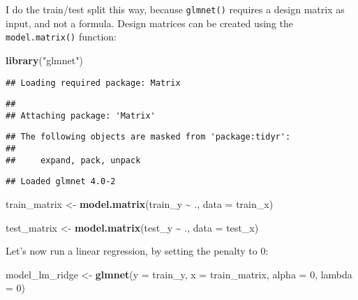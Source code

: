 \documentclass[
]{article}
\newenvironment{Shaded}{\begin{snugshade}}{\end{snugshade}}
\newcommand{\DataTypeTok}[1]{\textcolor[rgb]{0.13,0.29,0.53}{#1}}
\newcommand{\DecValTok}[1]{\textcolor[rgb]{0.00,0.00,0.81}{#1}}
\newcommand{\KeywordTok}[1]{\textcolor[rgb]{0.13,0.29,0.53}{\textbf{#1}}}
\newcommand{\NormalTok}[1]{#1}
\newcommand{\OperatorTok}[1]{\textcolor[rgb]{0.81,0.36,0.00}{\textbf{#1}}}
\newcommand{\StringTok}[1]{\textcolor[rgb]{0.31,0.60,0.02}{#1}}
\begin{document}
I do the train/test split this way, because \texttt{glmnet()} requires a design matrix as input, and not
a formula. Design matrices can be created using the \texttt{model.matrix()} function:

\begin{Shaded}
\begin{Highlighting}[]
\KeywordTok{library}\NormalTok{(}\StringTok{"glmnet"}\NormalTok{)}
\end{Highlighting}
\end{Shaded}

\begin{verbatim}
## Loading required package: Matrix
\end{verbatim}

\begin{verbatim}
## 
## Attaching package: 'Matrix'
\end{verbatim}

\begin{verbatim}
## The following objects are masked from 'package:tidyr':
## 
##     expand, pack, unpack
\end{verbatim}

\begin{verbatim}
## Loaded glmnet 4.0-2
\end{verbatim}

\begin{Shaded}
\begin{Highlighting}[]
\NormalTok{train\_matrix \textless{}{-}}\StringTok{ }\KeywordTok{model.matrix}\NormalTok{(train\_y }\OperatorTok{\textasciitilde{}}\StringTok{ }\NormalTok{., }\DataTypeTok{data =}\NormalTok{ train\_x)}

\NormalTok{test\_matrix \textless{}{-}}\StringTok{ }\KeywordTok{model.matrix}\NormalTok{(test\_y }\OperatorTok{\textasciitilde{}}\StringTok{ }\NormalTok{., }\DataTypeTok{data =}\NormalTok{ test\_x)}
\end{Highlighting}
\end{Shaded}

Let's now run a linear regression, by setting the penalty to 0:

\begin{Shaded}
\begin{Highlighting}[]
\NormalTok{model\_lm\_ridge \textless{}{-}}\StringTok{ }\KeywordTok{glmnet}\NormalTok{(}\DataTypeTok{y =}\NormalTok{ train\_y, }\DataTypeTok{x =}\NormalTok{ train\_matrix, }\DataTypeTok{alpha =} \DecValTok{0}\NormalTok{, }\DataTypeTok{lambda =} \DecValTok{0}\NormalTok{)}
\end{Highlighting}
\end{Shaded}
\end{document}
